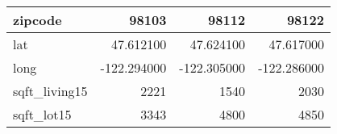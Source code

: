 \begin{table}[H]
\begin{tabular}{|l|r|r|r|}
\hline zipcode & \cellcolor[rgb]{0.9, 0.54, 0.52} 98103 & 98112 & 98122 \\
\hline lat & \cellcolor[rgb]{0.9, 0.54, 0.52} 47.612100 & 47.624100 & 47.617000 \\
\hline long & \cellcolor[rgb]{0.9, 0.54, 0.52} -122.294000 & \cellcolor[rgb]{0.9, 0.54, 0.52} -122.305000 & \cellcolor[rgb]{0.9, 0.54, 0.52} -122.286000 \\
\hline sqft\_living15 & \cellcolor[rgb]{0.9, 0.54, 0.52} 2221 & 1540 & 2030 \\
\hline sqft\_lot15 & \cellcolor[rgb]{0.9, 0.54, 0.52} 3343 & 4800 & 4850 \\
\hline
\end{tabular}
\end{table}
